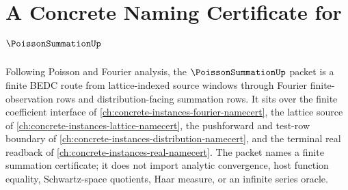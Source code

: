 \chapter{A Concrete Naming Certificate for $\PoissonSummationUp$}
\label{ch:concrete-instances-poisson-summation-namecert}

Following Poisson and Fourier analysis, the $\PoissonSummationUp$ packet is a finite BEDC route from lattice-indexed source windows through Fourier finite-observation rows and distribution-facing summation rows. It sits over the finite coefficient interface of \autoref{ch:concrete-instances-fourier-namecert}, the lattice source of \autoref{ch:concrete-instances-lattice-namecert}, the pushforward and test-row boundary of \autoref{ch:concrete-instances-distribution-namecert}, and the terminal real readback of \autoref{ch:concrete-instances-real-namecert}. The packet names a finite summation certificate; it does not import analytic convergence, host function equality, Schwartz-space quotients, Haar measure, or an infinite series oracle.

